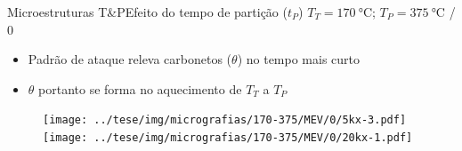 
\begin{frame}{Microestruturas T\&P}{Efeito do tempo de partição ($t_P$)}
  $T_T = \SI{170}{\degreeCelsius}$; $T_P = \SI{375}{\degreeCelsius}$ / 0

  \begin{itemize}
      \item Padrão de ataque releva carbonetos ($\theta$) no tempo mais curto
      \item $\theta$ portanto se forma no aquecimento de $T_T$ a $T_P$
  \end{itemize}

  \begin{figure}
    \texttt{[image: ../tese/img/micrografias/170-375/MEV/0/5kx-3.pdf]}\hfill
    \texttt{[image: ../tese/img/micrografias/170-375/MEV/0/20kx-1.pdf]}
  \end{figure}
\end{frame}

